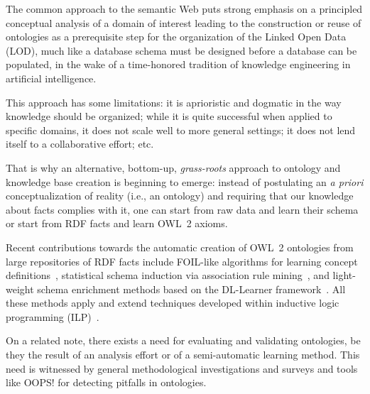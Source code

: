 \documentclass{llncs}
\begin{document}
The common approach to the semantic Web puts strong emphasis
on a principled conceptual analysis of a domain of interest
leading to the construction or reuse of ontologies
as a prerequisite step for the organization of the Linked Open Data (LOD),
much like a database schema must be designed before a database can be populated,
in the wake of a time-honored tradition of knowledge engineering in artificial intelligence.

This approach has some limitations:
it is aprioristic and dogmatic in the way knowledge should be organized;
while it is quite successful when applied to specific domains,
it does not scale well to more general settings;
it does not lend itself to a collaborative effort; etc.

That is why an alternative, bottom-up, \emph{grass-roots} approach to ontology and
knowledge base creation is beginning to emerge: instead of postulating an \emph{a priori}
conceptualization of reality (i.e., an ontology) and requiring that our knowledge
about facts complies with it, one can start from raw data and learn their schema
or start from RDF facts and learn OWL~2 axioms.

Recent contributions towards the automatic creation of OWL~2 ontologies
from large repositories of RDF facts include
FOIL-like algorithms for learning concept definitions~\cite{FanizziDAmatoEsposito2008},
statistical schema induction via association rule mining~\cite{FleischhackerVoelkerStuckenschmidt2012},
and light-weight schema enrichment methods based on the DL-Learner
framework~\cite{HellmannLehmannAuer2009,BuehmannLehmann2012}.
All these methods apply and extend techniques developed within inductive logic programming
(ILP)~\cite{ILPat20}.

On a related note, there exists a need for evaluating and validating ontologies,
be they the result of an analysis effort or of a semi-automatic learning method.
This need is witnessed by general methodological investigations
\cite{GangemiCatenacciCiaramitaLehmann2005,GangemiCatenacciCiaramitaLehmann2006}
and surveys \cite{TartirBudakArpinarSheth2007} and tools like OOPS! \cite{PovedaSuarezGomez2012}
for detecting pitfalls in ontologies.
\end{document}
